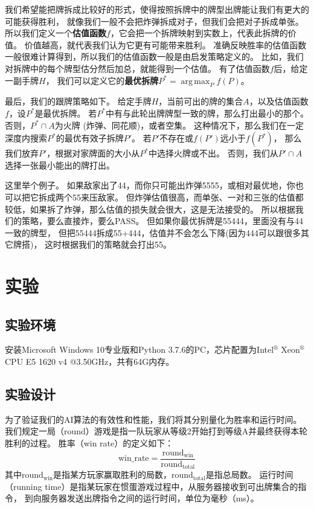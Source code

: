 \documentclass[a4paper]{ctexart}
\DeclareMathOperator*{\argmax}{arg\,max}
\begin{document}
\begin{enumerate}
\begin{enumerate}
    我们希望能把牌拆成比较好的形式，使得按照拆牌中的牌型出牌能让我们有更大的可能获得胜利，
    就像我们一般不会把炸弹拆成对子，但我们会把对子拆成单张。
    所以我们定义一个\textbf{估值函数}$f$，它会把一个拆牌映射到实数上，代表此拆牌的价值。
    价值越高，就代表我们认为它更有可能带来胜利。
    准确反映胜率的估值函数一般很难计算得到，所以我们的估值函数一般是由启发策略定义的。
    比如，我们对拆牌中的每个牌型估分然后加总，就能得到一个估值。
    有了估值函数$f$后，给定一副手牌$H$，
    我们可以定义它的\textbf{最优拆牌}$P^*=\argmax_{P} f(P)$。
    
    最后，我们的跟牌策略如下。
    给定手牌$H$，当前可出的牌的集合$A$，以及估值函数$f$，设$P^*$是最优拆牌。
    若$P^*$中有与此轮出牌牌型一致的牌，那么打出最小的那个。
    否则，$P^*\cap A$为火牌 (炸弹、同花顺)，或者空集。
    这种情况下，那么我们在一定深度内搜索$P^*$的最优有效子拆牌$P'$。
    若$P'$不存在或$f(P')$远小于$f(P^*)$，
    那么我们放弃$P'$，根据对家牌面的大小从$P^*$中选择火牌或不出。
    否则，我们从$P'\cap A$选择一张最小能出的牌打出。
    
    这里举个例子。
    如果敌家出了44，而你只可能出炸弹5555，或相对最优地，你也可以把它拆成两个55来压敌家。
    但炸弹估值很高，而单张、一对和三张的估值都较低，如果拆了炸弹，那么估值的损失就会很大，这是无法接受的。
    所以根据我们的策略，要么直接炸，要么PASS。
    但如果你最优拆牌是55444，里面没有与44一致的牌型，
    但把55444拆成55+444，估值并不会怎么下降(因为444可以跟很多其它牌搭)，
    这时根据我们的策略就会打出55。
    
  \end{enumerate}
\end{enumerate}

\section{实验} \label{sec:experiment}

\subsection{实验环境}

安装Microsoft Windows 10专业版和Python 3.7.6的PC，芯片配置为Intel$^\circledR$ Xeon$^\circledR$  CPU E5 1620 v4 @3.50GHz，共有64G内存。

\subsection{实验设计}

为了验证我们的AI算法的有效性和性能，我们将其分别量化为胜率和运行时间。
我们规定一局（round）游戏是指一队玩家从等级2开始打到等级A并最终获得本轮胜利的过程。
胜率（win rate）的定义如下：\[\mathrm{win\_rate} = \frac{\mathrm{round}_{\mathrm{win}}}{\mathrm{round}_{\mathrm{total}}}\]其中$\mathrm{round}_{\mathrm{win}}$是指某方玩家赢取胜利的局数，$\mathrm{round}_{\mathrm{total}}$是指总局数。
运行时间（running time）是指某玩家在惯蛋游戏过程中，从服务器接收到可出牌集合的指令，
到向服务器发送出牌指令之间的运行时间，单位为毫秒（ms）。
\end{document}
